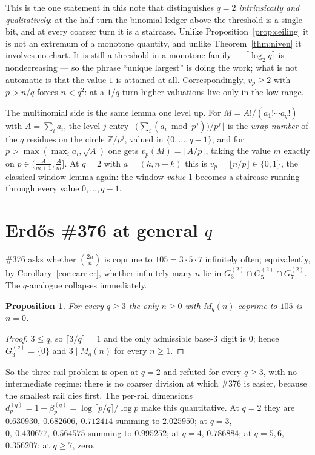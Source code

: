 \documentclass[11pt]{article}
\newtheorem{proposition}[theorem]{Proposition}
\begin{document}
This is the one statement in this note that distinguishes $q=2$ \emph{intrinsically and
qualitatively}: at the half-turn the binomial ledger above the threshold is a single bit, and
at every coarser turn it is a staircase.  Unlike Proposition~\ref{prop:ceiling} it is not an
extremum of a monotone quantity, and unlike Theorem~\ref{thm:niven} it involves no chart.  It
is still a threshold in a monotone family --- $\lceil\log_2q\rceil$ is nondecreasing --- so the
phrase ``unique largest'' is doing the work; what is not automatic is that the value $1$ is
attained at all.  Correspondingly, $v_p\ge2$ with $p>n/q$ forces $n<q^{2}$: at a $1/q$-turn
higher valuations live only in the low range.

The multinomial side is the same lemma one level up.  For $M=A!/(a_1!\cdots a_q!)$ with
$A=\sum_i a_i$, the level-$j$ entry $\bigl\lfloor\bigl(\sum_i(a_i\bmod p^{j})\bigr)/p^{j}\bigr\rfloor$
is the \emph{wrap number} of the $q$ residues on the circle $\mathbb Z/p^{j}$, valued in
$\{0,\dots,q-1\}$; and for $p>\max(\max_i a_i,\sqrt A)$ one gets $v_p(M)=\lfloor A/p\rfloor$,
taking the value $m$ exactly on $p\in\bigl(\tfrac A{m+1},\tfrac Am\bigr]$.  At $q=2$ with
$a=(k,n-k)$ this is $v_p=\lfloor n/p\rfloor\in\{0,1\}$, the classical window lemma again: the
window \emph{value} $1$ becomes a staircase running through every value $0,\dots,q-1$.

\section{Erd\H{o}s \#376 at general $q$}

\#376 asks whether $\binom{2n}{n}$ is coprime to $105=3\cdot5\cdot7$ infinitely often;
equivalently, by Corollary~\ref{cor:carrier}, whether infinitely many $n$ lie in
$G_3^{(2)}\cap G_5^{(2)}\cap G_7^{(2)}$.  The $q$-analogue collapses immediately.

\begin{proposition}\label{prop:376}
For every $q\ge3$ the only $n\ge0$ with $M_q(n)$ coprime to $105$ is $n=0$.
\end{proposition}

\begin{proof}
$3\le q$, so $\lceil3/q\rceil=1$ and the only admissible base-$3$ digit is $0$; hence
$G_3^{(q)}=\{0\}$ and $3\mid M_q(n)$ for every $n\ge1$.
\end{proof}

So the three-rail problem is open at $q=2$ and refuted for every $q\ge3$, with no intermediate
regime: there is no coarser division at which \#376 is easier, because the smallest rail dies
first.  The per-rail dimensions $d_p^{(q)}=1-\beta_p^{(q)}=\log\lceil p/q\rceil/\log p$ make
this quantitative.  At $q=2$ they are $0.630930,\ 0.682606,\ 0.712414$ summing to $2.025950$;
at $q=3$, $0,\ 0.430677,\ 0.564575$ summing to $0.995252$; at $q=4$, $0.786884$; at $q=5,6$,
$0.356207$; at $q\ge7$, zero.
\end{document}
